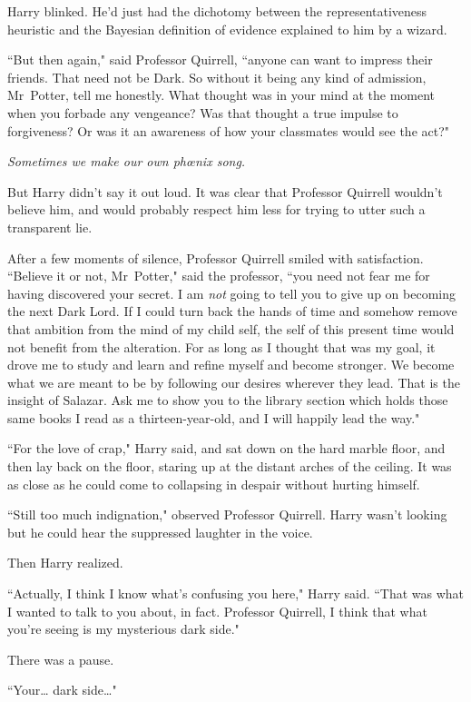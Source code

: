 Harry blinked. He'd just had the dichotomy between the representativeness heuristic and the Bayesian definition of evidence explained to him by a wizard.

``But then again," said Professor Quirrell, ``anyone can want to impress their friends. That need not be Dark. So without it being any kind of admission, Mr~Potter, tell me honestly. What thought was in your mind at the moment when you forbade any vengeance? Was that thought a true impulse to forgiveness? Or was it an awareness of how your classmates would see the act?"

\emph{Sometimes we make our own phœnix song.}

But Harry didn't say it out loud. It was clear that Professor Quirrell wouldn't believe him, and would probably respect him less for trying to utter such a transparent lie.

After a few moments of silence, Professor Quirrell smiled with satisfaction. ``Believe it or not, Mr~Potter," said the professor, ``you need not fear me for having discovered your secret. I am \emph{not} going to tell you to give up on becoming the next Dark Lord. If I could turn back the hands of time and somehow remove that ambition from the mind of my child self, the self of this present time would not benefit from the alteration. For as long as I thought that was my goal, it drove me to study and learn and refine myself and become stronger. We become what we are meant to be by following our desires wherever they lead. That is the insight of Salazar. Ask me to show you to the library section which holds those same books I read as a thirteen-year-old, and I will happily lead the way."

``For the love of crap," Harry said, and sat down on the hard marble floor, and then lay back on the floor, staring up at the distant arches of the ceiling. It was as close as he could come to collapsing in despair without hurting himself.

``Still too much indignation," observed Professor Quirrell. Harry wasn't looking but he could hear the suppressed laughter in the voice.

Then Harry realized.

``Actually, I think I know what's confusing you here," Harry said. ``That was what I wanted to talk to you about, in fact. Professor Quirrell, I think that what you're seeing is my mysterious dark side."

There was a pause.

``Your{\ldots} dark side{\ldots}"


